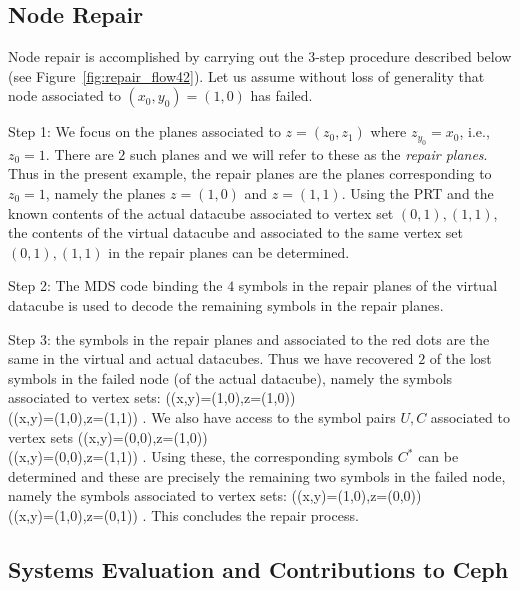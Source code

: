 \begin{multicols}{2}
 \subsection{Node Repair}

\vskip -3pt

 Node repair is accomplished by carrying out the $3$-step procedure described below (see Figure~\ref{fig:repair_flow42}). Let us assume without loss of generality that node associated to $(x_0,y_0)=(1,0)$ has failed.
 \bit
 \item Step 1:  We focus on the planes associated to $z=(z_0,z_1)$ where $z_{y_0}=x_0$, i.e., $z_{0}=1$. There are $2$ such planes and we will refer to these as the {\em repair planes}.  Thus in the present example, the repair planes are the planes corresponding to $z_0=1$, namely the planes $z=(1,0)$ and $z=(1,1)$.  Using the PRT and the known contents of the actual datacube associated to vertex set $(0,1),(1,1)$, the contents of the virtual datacube and associated to the same vertex set $(0,1),(1,1)$ in the repair planes can be determined.  
 \item Step 2: The MDS code binding the $4$ symbols in the repair planes of the virtual datacube is used to decode the remaining symbols in the repair planes. 
 \item Step 3: the symbols in the repair planes and associated to the red dots are the same in the virtual and actual datacubes.  Thus we have recovered $2$ of the lost symbols in the failed node (of the actual datacube), namely the symbols associated to vertex sets:
 \bean
 ((x,y)=(1,0),z=(1,0)) \\   ((x,y)=(1,0),z=(1,1)) .
 \eean
 We also have access to the symbol pairs $U,C$ associated to vertex sets 
 \bean
 ((x,y)=(0,0),z=(1,0))\\    ((x,y)=(0,0),z=(1,1)) .
 \eean
 Using these, the corresponding symbols $C^*$ can be determined and these are precisely the remaining two symbols in the failed node, namely the symbols associated to vertex sets:
 \bean
 ((x,y)=(1,0),z=(0,0))\\    ((x,y)=(1,0),z=(0,1)) .
 \eean
 This concludes the repair process. 
 \eit
 
\vskip -20pt

 \subsection{Systems Evaluation and Contributions to Ceph}


\end{multicols}
